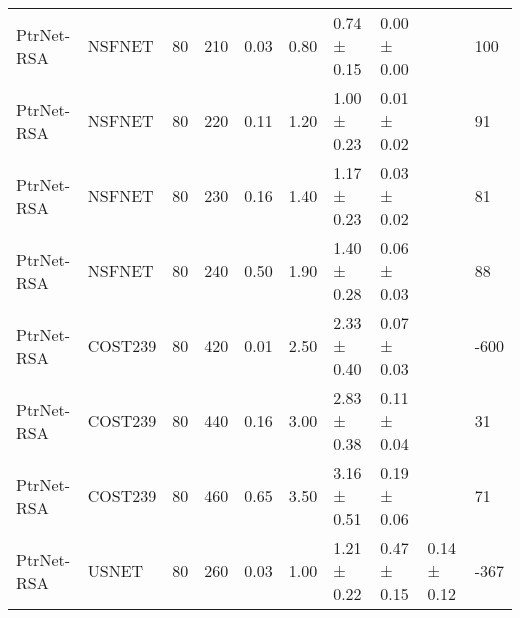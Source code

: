 \begin{longtable}[!htbp]{llll|lllll|l}
PtrNet-RSA           & NSFNET            & 80                   & 210                                                               & 0.03 & \multicolumn{1}{l|}{0.80}     & 0.74 ± 0.15 & 0.00 ± 0.00            &                   & 100                                                                                     \\
PtrNet-RSA           & NSFNET            & 80                   & 220                                                               & 0.11 & \multicolumn{1}{l|}{1.20}     & 1.00 ± 0.23    & 0.01 ± 0.02      &                   & 91                                                                                    \\
PtrNet-RSA           & NSFNET            & 80                   & 230                                                               & 0.16 & \multicolumn{1}{l|}{1.40}     & 1.17 ± 0.23 & 0.03 ± 0.02      &                   & 81                                                                                    \\
PtrNet-RSA           & NSFNET            & 80                   & 240                                                               & 0.50  & \multicolumn{1}{l|}{1.90}     & 1.40 ± 0.28  & 0.06 ± 0.03      &                   & 88                                                                                      \\
PtrNet-RSA           & COST239           & 80                   & 420                                                               & 0.01 & \multicolumn{1}{l|}{2.50}     & 2.33 ± 0.40  & 0.07 ± 0.03      &                   & -600                                                                                    \\
PtrNet-RSA           & COST239           & 80                   & 440                                                               & 0.16 & \multicolumn{1}{l|}{3.00}       & 2.83 ± 0.38 & 0.11 ± 0.04      &                   & 31                                                                                    \\
PtrNet-RSA           & COST239           & 80                   & 460                                                               & 0.65 & \multicolumn{1}{l|}{3.50}     & 3.16 ± 0.51 & 0.19 ± 0.06      &                   & 71                                                                                    \\
PtrNet-RSA           & USNET             & 80                   & 260                                                               & 0.03 & \multicolumn{1}{l|}{1.00}       & 1.21 ± 0.22 & 0.47 ± 0.15      & 0.14 ± 0.12       & -367                                                                                 \\

\end{longtable}
